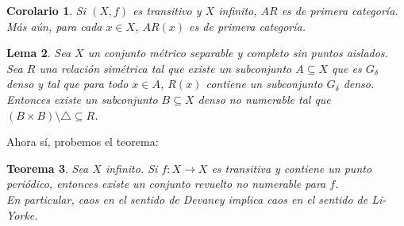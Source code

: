 \documentclass[12pt,a4paper]{article}
\newtheorem{theorem}{Teorema}[section]
\newtheorem{corollary}[theorem]{Corolario}
\newtheorem{lemma}[theorem]{Lema}
\begin{document}
\begin{corollary}
Si $(X,f)$ es transitivo y $X$ infinito, $AR$ es de primera categoría. Más aún, para cada $x \in X$, $AR(x)$ es de primera categoría.
\end{corollary}

\begin{lemma}
Sea $X$ un conjunto métrico separable y completo sin puntos aislados. Sea $R$ una relación simétrica tal que existe un subconjunto $A \subseteq X$ que es $G_\delta$ denso y tal que para todo $x \in A$, $R(x)$ contiene un subconjunto $G_\delta$ denso. Entonces existe un subconjunto $B \subseteq X$ denso no numerable tal que $(B \times B) \setminus \triangle \subseteq R$. 
\end{lemma}
Ahora sí, probemos el teorema:
\begin{theorem}
Sea $X$ infinito. Si $f:X \rightarrow X$ es transitiva y contiene un punto periódico, entonces existe un conjunto revuelto no numerable para $f$.
\\
En particular, caos en el sentido de Devaney implica caos en el sentido de Li-Yorke.
\end{theorem}
\end{document}
